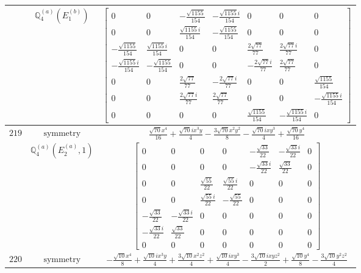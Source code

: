 \documentclass[fleqn,8pt,landscape]{jsarticle}
\begin{document}
\begin{longtable}{ccc}
$  $ & $ \mathbb{Q}_{4}^{(a)}(E_{1}^{(b)}) $ & $ \begin{bmatrix} 0 & 0 & - \frac{\sqrt{1155}}{154} & - \frac{\sqrt{1155} i}{154} & 0 & 0 & 0 \\ 0 & 0 & \frac{\sqrt{1155} i}{154} & - \frac{\sqrt{1155}}{154} & 0 & 0 & 0 \\ - \frac{\sqrt{1155}}{154} & \frac{\sqrt{1155} i}{154} & 0 & 0 & \frac{2 \sqrt{77}}{77} & \frac{2 \sqrt{77} i}{77} & 0 \\ - \frac{\sqrt{1155} i}{154} & - \frac{\sqrt{1155}}{154} & 0 & 0 & - \frac{2 \sqrt{77} i}{77} & \frac{2 \sqrt{77}}{77} & 0 \\ 0 & 0 & \frac{2 \sqrt{77}}{77} & - \frac{2 \sqrt{77} i}{77} & 0 & 0 & \frac{\sqrt{1155}}{154} \\ 0 & 0 & \frac{2 \sqrt{77} i}{77} & \frac{2 \sqrt{77}}{77} & 0 & 0 & - \frac{\sqrt{1155} i}{154} \\ 0 & 0 & 0 & 0 & \frac{\sqrt{1155}}{154} & - \frac{\sqrt{1155} i}{154} & 0 \end{bmatrix} $ \\ \hline
$ 219 $ & $ \text{symmetry} $ & $ \frac{\sqrt{70} x^{4}}{16} + \frac{\sqrt{70} i x^{3} y}{4} - \frac{3 \sqrt{70} x^{2} y^{2}}{8} - \frac{\sqrt{70} i x y^{3}}{4} + \frac{\sqrt{70} y^{4}}{16} $ \\
$  $ & $ \mathbb{Q}_{4}^{(a)}(E_{2}^{(a)},1) $ & $ \begin{bmatrix} 0 & 0 & 0 & 0 & - \frac{\sqrt{33}}{22} & - \frac{\sqrt{33} i}{22} & 0 \\ 0 & 0 & 0 & 0 & - \frac{\sqrt{33} i}{22} & \frac{\sqrt{33}}{22} & 0 \\ 0 & 0 & \frac{\sqrt{55}}{22} & \frac{\sqrt{55} i}{22} & 0 & 0 & 0 \\ 0 & 0 & \frac{\sqrt{55} i}{22} & - \frac{\sqrt{55}}{22} & 0 & 0 & 0 \\ - \frac{\sqrt{33}}{22} & - \frac{\sqrt{33} i}{22} & 0 & 0 & 0 & 0 & 0 \\ - \frac{\sqrt{33} i}{22} & \frac{\sqrt{33}}{22} & 0 & 0 & 0 & 0 & 0 \\ 0 & 0 & 0 & 0 & 0 & 0 & 0 \end{bmatrix} $ \\ \hline
$ 220 $ & $ \text{symmetry} $ & $ - \frac{\sqrt{10} x^{4}}{8} + \frac{\sqrt{10} i x^{3} y}{4} + \frac{3 \sqrt{10} x^{2} z^{2}}{4} + \frac{\sqrt{10} i x y^{3}}{4} - \frac{3 \sqrt{10} i x y z^{2}}{2} + \frac{\sqrt{10} y^{4}}{8} - \frac{3 \sqrt{10} y^{2} z^{2}}{4} $ \\

\end{longtable}
\end{document}
